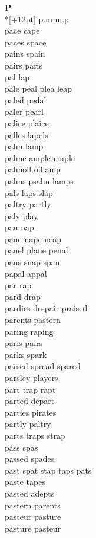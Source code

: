 \vspace{14pt}
\noindent\textbf{\Large P}\\*[+12pt]
p.m m.p\\
pace cape\\
paces space\\
pains spain\\
pairs paris\\
pal lap\\
pale peal plea leap\\
paled pedal\\
paler pearl\\
palice plaice\\
palles lapels\\
palm lamp\\
palme ample maple\\
palmoil oillamp\\
palms psalm lamps\\
pals laps slap\\
paltry partly\\
paly play\\
pan nap\\
pane nape neap\\
panel plane penal\\
pans snap span\\
papal appal\\
par rap\\
pard drap\\
pardies despair praised\\
parents pastern\\
paring raping\\
paris pairs\\
parks spark\\
parsed spread spared\\
parsley players\\
part trap rapt\\
parted depart\\
parties pirates\\
partly paltry\\
parts traps strap\\
pass spas\\
passed spades\\
past spat stap taps pats\\
paste tapes\\
pasted adepts\\
pastern parents\\
pasteur pasture\\
pasture pasteur\\

